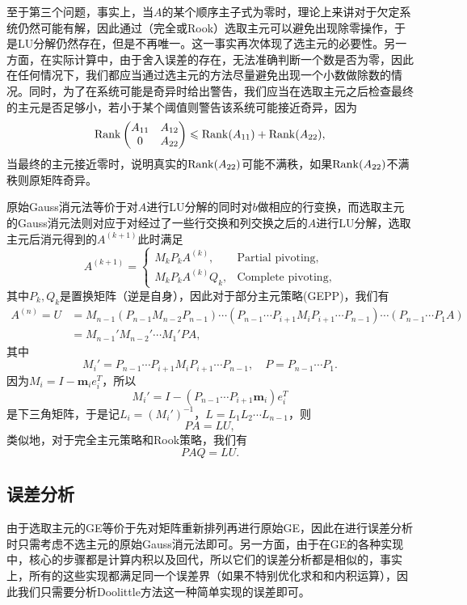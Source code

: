 \documentclass[a4paper,10pt]{ctexart}
\begin{document}
至于第三个问题，事实上，当$ A $的某个顺序主子式为零时，理论上来讲对于欠定系统仍然可能有解，因此通过（完全或Rook）选取主元可以避免出现除零操作，于是LU分解仍然存在，但是不再唯一。这一事实再次体现了选主元的必要性。另一方面，在实际计算中，由于舍入误差的存在，无法准确判断一个数是否为零，因此在任何情况下，我们都应当通过选主元的方法尽量避免出现一个小数做除数的情况。同时，为了在系统可能是奇异时给出警告，我们应当在选取主元之后检查最终的主元是否足够小，若小于某个阈值则警告该系统可能接近奇异，因为
\[
    {\rm Rank} \begin{pmatrix}
        A_{11} & A_{12} \\
        0 & A_{22}
    \end{pmatrix} \leqslant {\rm Rank} (A_{11}) + {\rm Rank} (A_{22}),
\]
当最终的主元接近零时，说明真实的$ {\rm Rank} (A_{22}) $可能不满秩，如果$ {\rm Rank} (A_{22}) $不满秩则原矩阵奇异。

原始Gauss消元法等价于对$ A $进行LU分解的同时对$ b $做相应的行变换，而选取主元的Gauss消元法则对应于对经过了一些行交换和列交换之后的$ A $进行LU分解，选取主元后消元得到的$ A^{(k+1)} $此时满足
\[
    A^{(k+1)} = 
    \begin{cases}
        M_kP_kA^{(k)},& \text{Partial pivoting},\\
        M_kP_kA^{(k)}Q_k,& \text{Complete pivoting},
    \end{cases}
\]
其中$ P_k,Q_k $是置换矩阵（逆是自身），因此对于部分主元策略(GEPP)，我们有
\[
    \begin{aligned}
        A^{(n)} = U 
        &= M_{n-1}(P_{n-1}M_{n-2}P_{n-1})\cdots (P_{n-1}\cdots P_{i+1}M_{i}P_{i+1}\cdots P_{n-1})\cdots (P_{n-1}\cdots P_1A)\\
        &= M_{n-1}'M_{n-2}'\cdots M_1'PA,
    \end{aligned}
\]
其中
\[
    M_{i}' = P_{n-1}\cdots P_{i+1}M_{i}P_{i+1}\cdots P_{n-1},\quad P = P_{n-1}\cdots P_1.
\]
因为$ M_i = I - \bm{m}_i e_i^T $，所以
\[
    M_i' = I - (P_{n-1}\cdots P_{i+1} \bm{m}_i)e_i^T
\]
是下三角矩阵，于是记$ L_i = (M_i')^{-1} $，$ L = L_1 L_2\cdots L_{n-1} $，则
\begin{equation}
    PA = LU,
\end{equation}
类似地，对于完全主元策略和Rook策略，我们有
\begin{equation}
    PAQ = LU.
\end{equation}

\subsection{误差分析}
由于选取主元的GE等价于先对矩阵重新排列再进行原始GE，因此在进行误差分析时只需考虑不选主元的原始Gauss消元法即可。另一方面，由于在GE的各种实现中，核心的步骤都是计算内积以及回代，所以它们的误差分析都是相似的，事实上，所有的这些实现都满足同一个误差界（如果不特别优化求和和内积运算），因此我们只需要分析Doolittle方法这一种简单实现的误差即可。
\end{document}
